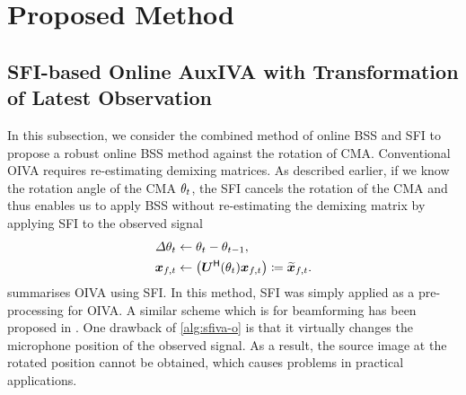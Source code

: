 \documentclass[sip,biber]{now-journal}
\begin{document}
\section{Proposed Method}\label{sec:proposed}


\subsection{SFI-based Online AuxIVA with Transformation of Latest Observation}

In this subsection, we consider the combined method of online BSS and SFI \cite{Wakabayashi:2023:ASLP} to propose a robust online BSS method against the rotation of CMA.
Conventional OIVA requires re-estimating demixing matrices.
As described earlier, if we know the rotation angle of the CMA $\theta _{t}$, the SFI cancels the rotation of the CMA and thus enables us to apply BSS without re-estimating the demixing matrix by applying SFI to the observed signal
\begin{align}
  \varDelta \rotSpat _{\tframe} &\gets \rotSpat _{\tframe} - \rotSpat _{\tframe - 1}, \\
  \Obs _{\ft} &\gets \left(\rotMat ^{\hermite} (\rotSpat _{\tframe}) \Obs _{\ft}\right) \coloneqq \refpos{\Obs} _{\ft}.
\end{align}
 summarises OIVA using SFI.
In this method, SFI was simply applied as a pre-processing for OIVA.
A similar scheme which is for beamforming has been proposed in \cite{Wakabayashi:2023:ASLP}.
One drawback of \cref{alg:sfiva-o} is that it virtually changes the microphone position of the observed signal.
As a result, the source image at the rotated position cannot be obtained, which causes problems in practical applications.
\end{document}
